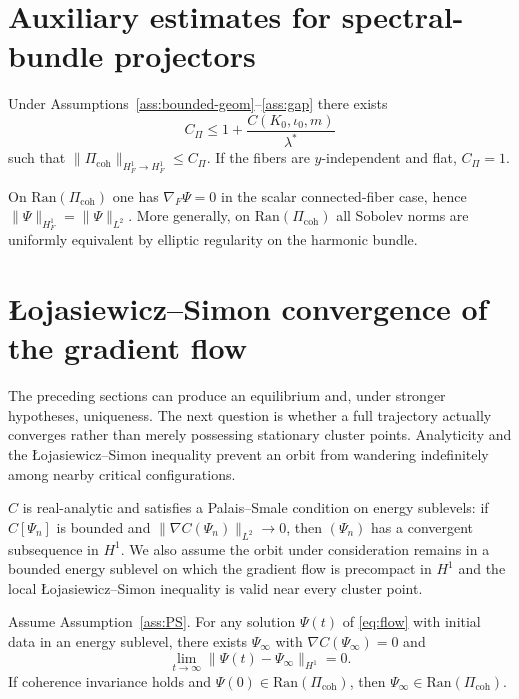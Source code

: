 \documentclass[11pt]{article}
\providecommand{\PiCoh}{\Pi_{\mathrm{coh}}}
\providecommand{\Ran}{\mathrm{Ran}}
\providecommand{\FPpdf}[2]{\texorpdfstring{#1}{#2}}
\providecommand{\lamstar}{\ensuremath{\lambda^{\ast}}}
\begin{document}
\section{Auxiliary estimates for spectral-bundle projectors}

\begin{theorem}[Explicit $H^1_F$ bound for $\PiCoh$]\label{thm:PiBound}
Under Assumptions~\ref{ass:bounded-geom}--\ref{ass:gap} there exists
\[
C_\Pi \le 1 + \frac{C(K_0,\iota_0,m)}{\lamstar}
\]
such that $\|\PiCoh\|_{H^1_F\to H^1_F}\le C_\Pi$.
If the fibers are $y$-independent and flat, $C_\Pi=1$.
\end{theorem}

\begin{lemma}
On $\Ran(\PiCoh)$ one has $\nabla_F\Psi=0$ in the scalar connected-fiber case, hence
$\|\Psi\|_{H^1_F}=\|\Psi\|_{L^2}$. More generally, on $\Ran(\PiCoh)$ all Sobolev norms are uniformly equivalent by elliptic regularity on the harmonic bundle.
\end{lemma}

\section{\FPpdf{\L{}ojasiewicz--Simon}{Lojasiewicz--Simon} convergence of the gradient flow}

The preceding sections can produce an equilibrium and, under stronger
hypotheses, uniqueness.  The next question is whether a full trajectory
actually converges rather than merely possessing stationary cluster points.
Analyticity and the \L{}ojasiewicz--Simon inequality prevent an orbit from
wandering indefinitely among nearby critical configurations.

\begin{assumption}\label{ass:PS}
$C$ is real-analytic and satisfies a Palais--Smale condition on energy sublevels:
if $C[\Psi_n]$ is bounded and $\|\nabla C(\Psi_n)\|_{L^2}\to 0$, then $(\Psi_n)$ has a convergent subsequence in $H^1$.
We also assume the orbit under consideration remains in a bounded energy
sublevel on which the gradient flow is precompact in $H^1$ and the local
\L{}ojasiewicz--Simon inequality is valid near every cluster point.
\end{assumption}

\begin{theorem}
Assume Assumption~\ref{ass:PS}. For any solution $\Psi(t)$ of \eqref{eq:flow} with initial data in an energy sublevel,
there exists $\Psi_\infty$ with $\nabla C(\Psi_\infty)=0$ and
\[
\lim_{t\to\infty}\|\Psi(t)-\Psi_\infty\|_{H^1}=0.
\]
If coherence invariance holds and $\Psi(0)\in \Ran(\PiCoh)$, then $\Psi_\infty\in \Ran(\PiCoh)$.
\end{theorem}
\end{document}
